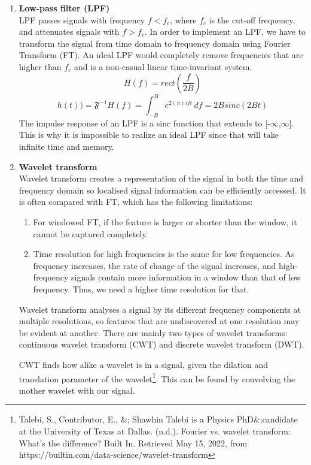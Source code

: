 \begin{enumerate}
    \item \textbf{Low-pass filter (LPF)}\\
    LPF passes signals with frequency \(f<f_{c}\), where \(f_{c}\) is the cut-off frequency, and attenuates
    signals with \(f>f_{c}\). 
    In order to implement an LPF, we have to transform the signal from time domain to 
    frequency domain using Fourier Transform (FT). An ideal LPF would completely remove frequencies that are
    higher than \(f_{c}\) and is a non-casual linear time-invariant system. 
    \[H(f) = rect(\frac{f}{2B})\]
    \[h(t))= \mathfrak{F}^{-1}{H(f)} = \int_{-B}^{B} e^{2(\pi)ift}\,df = 2Bsinc(2Bt)\]
    The impulse response of an LPF is a sinc function that extends to [-$\infty$,$\infty$]. This is why it is 
    impossible to realize an ideal LPF since that will take infinite time and memory.

    \item \textbf{Wavelet transform}\\
    Wavelet transform creates a representation of the signal in both the time and frequency domain so localised 
    signal information can be efficiently accessed. It is often compared with FT, which
    has the following limitations: 
    \begin{enumerate}
        \item For windowed FT, if the feature is larger or shorter than the window, it cannot be captured completely.
        \item Time resolution for high frequencies is the same for low frequencies. As frequency increases, the rate of 
        change of the signal increases, and high-frequency signals contain more information in a window than that of 
        low frequency. Thus, we need a higher time resolution for that.
    \end{enumerate}
    Wavelet transform analyses a signal by its different frequency components at multiple resolutions, so features that are 
    undiscovered at one resolution may be evident at another. There are mainly two types of wavelet transforms: continuous wavelet transform (CWT) and discrete wavelet transform (DWT).
    
    CWT finds how alike a wavelet is in a signal, given the dilation and translation parameter of the wavelet\footnote{Talebi, S., Contributor, E., \&; Shawhin Talebi is a Physics PhD\&;candidate at the University of Texas at Dallas. (n.d.). Fourier vs. wavelet transform: What's the difference? Built In. Retrieved May 15, 2022, from https://builtin.com/data-science/wavelet-transform }.
    This can be found by convolving the mother wavelet with our signal.


\end{enumerate}
